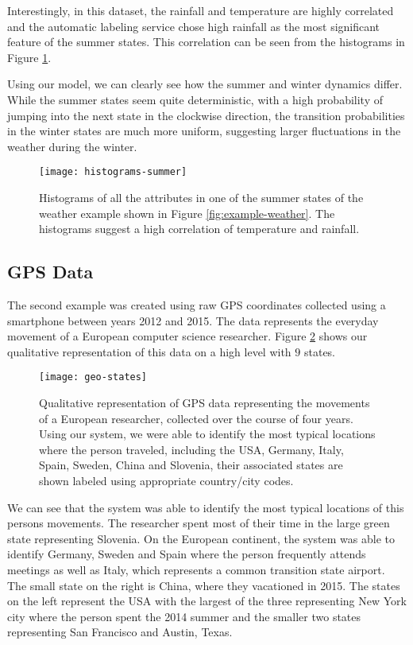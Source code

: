 Interestingly, in this dataset, the rainfall and temperature are highly correlated and the automatic labeling service
chose high rainfall as the most significant feature of the summer states. This correlation can be seen
from the histograms in Figure \ref{fig:histograms-summer}.

Using our model, we can clearly see how the summer and winter dynamics differ. While the summer states seem quite deterministic, with a high probability of jumping into the next state in the clockwise direction, the transition probabilities in the winter states are much more uniform, suggesting larger fluctuations in the weather during the winter.

\begin{figure}[h!]
	\centering
	\texttt{[image: histograms-summer]}
	\caption{Histograms of all the attributes in one of the summer states of the weather example shown in Figure \ref{fig:example-weather}. The histograms suggest a high correlation of temperature and rainfall.}
	\label{fig:histograms-summer}
\end{figure}

\subsection{GPS Data}

The second example was created using raw GPS coordinates collected using a smartphone between years 2012 and 2015.
The data represents the everyday movement of a European computer science researcher. Figure \ref{fig:example-geo}
shows our qualitative representation of this data on a high level with $9$ states.

\begin{figure}[h!]
	\centering
	\texttt{[image: geo-states]}
	\caption{Qualitative representation of GPS data representing the movements of a European researcher, collected over the course of four years. Using our system, we were able to identify the most typical locations where the person traveled, including the USA, Germany, Italy, Spain, Sweden, China and Slovenia, their associated states are shown labeled using appropriate country/city codes.}
	\label{fig:example-geo}
\end{figure}

We can see that the system was able to identify the most typical locations of this persons
movements. The researcher spent most of their time in the large green state representing Slovenia. On the European continent, the system was able to identify Germany, Sweden and Spain where the person frequently attends meetings as well as Italy, which represents a common transition state airport. The small state on the right is China, where they vacationed in 2015. The states on the left represent the USA with the largest of the three representing New York city where the person spent the 2014 summer and the smaller two states representing San Francisco and Austin, Texas.

